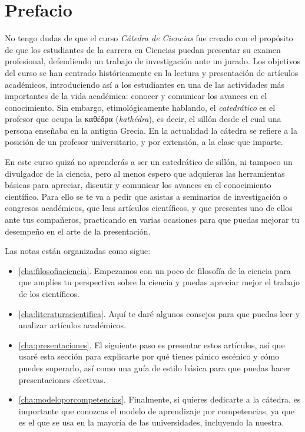 \chapter{Prefacio}
\label{cha:prefacio}

No tengo dudas de que el curso \emph{Cátedra de Ciencias} fue creado con el
propósito de que los estudiantes de la carrera en Ciencias puedan presentar su
examen profesional, defendiendo un trabajo de investigación ante un jurado.
Los objetivos del curso se han centrado históricamente en la lectura y
presentación de artículos académicos, introduciendo así a los estudiantes en
una de las actividades más importantes de la vida académica: conocer y
comunicar los avances en el conocimiento.
Sin embargo, etimológicamente hablando, el \emph{catedrático} es el profesor
que ocupa la καθέδρα (\emph{kathédra}), es decir, el sillón desde el cual una
persona enseñaba en la antigua Grecia.
En la actualidad la cátedra se refiere a la posición de un profesor
universitario, y por extensión, a la clase que imparte.

En este curso quizá no aprenderás a ser un catedrático de sillón, ni tampoco un
divulgador de la ciencia, pero al menos espero que adquieras las herramientas
básicas para apreciar, discutir y comunicar los avances en el conocimiento
científico.
Para ello se te va a pedir que asistas a seminarios de investigación o
congresos académicos, que leas artículos científicos, y que presentes uno de
ellos ante tus compañeros, practicando en varias ocasiones para que puedas
mejorar tu desempeño en el arte de la presentación.

Las notas están organizadas como sigue:

\begin{itemize}
      \item \autoref{cha:filosofiaciencia}. Empezamos con un poco de filosofía de
            la ciencia para que amplíes tu perspectiva sobre la ciencia y puedas
            apreciar mejor el trabajo de los científicos.
      \item \autoref{cha:literaturacientifica}. Aquí te daré algunos consejos
            para que puedas leer y analizar artículos académicos.
      \item \autoref{cha:presentaciones}. El siguiente paso es presentar estos
            artículos, así que usaré esta sección para explicarte por qué tienes
            pánico escénico y cómo puedes superarlo, así como una guía de estilo
            básica para que puedas hacer presentaciones efectivas.
      \item \autoref{cha:modeloporcompetencias}. Finalmente, si quieres
            dedicarte a la cátedra, es importante que conozcas el modelo de
            aprendizaje por competencias, ya que es el que se usa en la mayoría
            de las universidades, incluyendo la nuestra.
\end{itemize}
